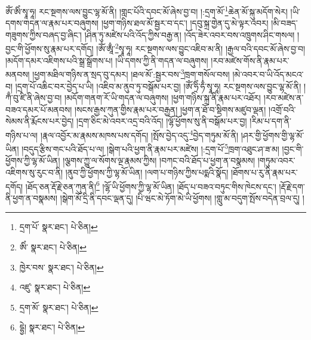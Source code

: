 ཨོཾ་ཨིཾ་སྭཱ་ཧཱ། རང་སྔགས་ལས་བྱུང་ལྷ་མོ་ནི། །གླང་པོའི་དབང་མོ་ཞེས་བྱ་བ། །:དྲག་མོ་\footnote{དྲག་པོ་  སྣར་ཐང་།  པེ་ཅིན། }ཆེན་མོ་སྐུ་མདོག་སེར། །ཡི་དགས་གདན་ལ་རྣམ་པར་བཞུགས། །ཕྱག་གཉིས་ཐལ་མོ་སྦྱར་བ་དང་། །དབུ་སྐྲ་གྱེན་དུ་མེ་ལྟར་འབར། །མི་བཟད་གཟུགས་ཀྱིས་བཞད་བྱ་ཞིང་། །ཤིན་ཏུ་མཛེས་པའི་འོད་ཀྱིས་བརྒྱ་ན། །འོད་ཟེར་འབར་བས་འཁྲུགས་ཤིང་གསལ། །བྱང་གི་ཕྱོགས་སུ་རྣམ་པར་དགོད། །ཨོཾ་ཨཱྃ་\footnote{ཨིཾ་  སྣར་ཐང་།  པེ་ཅིན། }སྭཱ་ཧཱ། རང་སྔགས་ལས་བྱུང་འཇིབ་མ་ནི། །རྒྱལ་བའི་དབང་མོ་ཞེས་བྱ་བ། །མདོག་དམར་འཇིགས་པའི་སྒྲ་སྒྲོགས་པ། །ཡི་དགས་ཀྱི་ནི་གདན་ལ་བཞུགས། །རབ་མཛེས་གོས་ནི་རྣམ་པར་མནབས། །ཕྱག་མཐིལ་གཉིས་ན་སྲད་བུ་དམར། །ཐལ་མོ་:སྦྱར་བས་\footnote{ཁྱེར་བས་  སྣར་ཐང་།  པེ་ཅིན། }ཁྲག་གསོལ་བས། །མེ་འབར་བ་ཡི་འོད་མངའ་བ། །དྲག་པོ་འཆིང་བར་བྱེད་པ་ཡི། །འཇིབ་མ་ནུབ་ཏུ་བསྒོམ་པར་བྱ། །ཨོཾ་ཧྲིཾ་ཧྃ་སྭཱ་ཧཱ། རང་སྔགས་ལས་བྱུང་ལྷ་མོ་ནི། །ཀྃ་བུ་ཛི་ནི་ཞེས་བྱ་བ། །མདོག་གནག་རོ་ཡི་གདན་ལ་བཞུགས། །ཕྱག་གཉིས་སྐྲ་ནི་རྣམ་པར་འཐོར། །རབ་མཛེས་ན་བཟའ་དམར་པོ་མནབས། །སངས་རྒྱས་ཀུན་གྱིས་རྣམ་པར་བརྒྱན། །ཕྱག་ན་ཐོ་བ་སྡིགས་མཛུབ་ལྡན། །འགྲོ་བའི་སེམས་ནི་རྨོངས་པར་བྱེད། །དྲག་ཅིང་མེ་འབར་འདྲ་བའི་འོད། །ལྷོ་ཕྱོགས་སུ་ནི་བསྒོམ་པར་བྱ། །རིམ་པ་དག་ནི་གཉིས་པ་ལ། །རྣལ་འབྱོར་མ་རྣམས་མཁས་པས་དགོད། །སྤོས་བྱེད་འདུ་\footnote{འཛུ་  སྣར་ཐང་།  པེ་ཅིན། }བྱེད་གཏུམ་མོ་ནི། །ཤར་གྱི་ཕྱོགས་གྱི་ལྷ་མོ་ཡིན། །བདུད་རྩིས་གང་པའི་ཐོད་པ་ལ། །སྒེག་པའི་ཕྱག་ནི་རྣམ་པར་མཛེས། །:དྲག་པོ་\footnote{དྲག་མོ་  སྣར་ཐང་།  པེ་ཅིན། }ཁྲག་འཐུང་ཤ་ཟ་མ། །བྱང་གི་ཕྱོགས་ཀྱི་ལྷ་མོ་ཡིན། །ལྕགས་ཀྱུ་ལ་སོགས་ལྔ་རྣམས་ཀྱིས། །བཀང་བའི་ཐོད་པ་ཕྱག་ན་བསྣམས། །གཏུམ་འབར་འཇིགས་སུ་རུང་བ་ནི། །ནུབ་ཀྱི་ཕྱོགས་ཀྱི་ལྷ་མོ་ཡིན། །ལག་པ་གཉིས་ཀྱིས་པདྨའི་སྣོད། །ཐོགས་པ་རུ་ནི་རྣམ་པར་དགོད། །ཐོད་ཅན་རྡོ་རྗེ་ཅན་ཀུན་ནི།\footnote{དྷྱེ།  སྣར་ཐང་།  པེ་ཅིན། } །ལྷོ་ཡི་ཕྱོགས་ཀྱི་ལྷ་མོ་ཡིན། །ཐོད་པ་བཟའ་བཏུང་གིས་ཁེངས་དང་། །རྡོ་རྗེ་དག་ནི་ཕྱག་ན་བསྣམས། །སྒེག་མོ་དྲི་ནི་དབང་ལྡན་དུ། །པི་ཝང་མེ་ཏོག་མེ་ཡི་ཕྱོགས། །གླུ་མ་བདུག་སྤོས་བདེན་བྲལ་དུ། །
